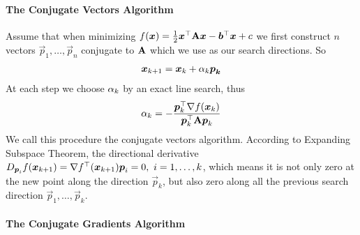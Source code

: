 \paragraph{The Conjugate Vectors Algorithm}

Assume that when minimizing $f(\boldsymbol{x})=\frac{1}{2}\boldsymbol{x}{}^\top\mathbf{A}\boldsymbol{x}-\boldsymbol{b}{}^\top\boldsymbol{x}+c$ we first construct $n$ vectors $\vec{p}_1,\dotsc,\vec{p}_n$ conjugate to $\mathbf{A}$ which we use as our search directions. So
\begin{align*}
	\boldsymbol{x}_{k+1}=\boldsymbol{x}_k+\alpha_k\boldsymbol{\boldsymbol{p}_k}
\end{align*}
At each step we choose $\alpha_k$ by an exact line search, thus
\begin{align*}
	\alpha_k=-\frac{\boldsymbol{p}_k^\top\nabla f(\boldsymbol{x}_k)}{\boldsymbol{p}_k^\top\mathbf{A}\boldsymbol{p}_k}
\end{align*}
We call this procedure the conjugate vectors algorithm. According to Expanding Subspace Theorem, the directional derivative $D_{\boldsymbol{p}_i}f(\boldsymbol{x}_{k+1})=\nabla f^\top(\boldsymbol{x}_{k+1})\boldsymbol{p}_i=0,\ i=1,\dotsc,k$, which means it is not only zero at the new point along the direction $\vec{p}_k$, but also zero along all the previous search direction $\vec{p}_1,\dotsc,\vec{p}_k$.

\paragraph{The Conjugate Gradients Algorithm}

